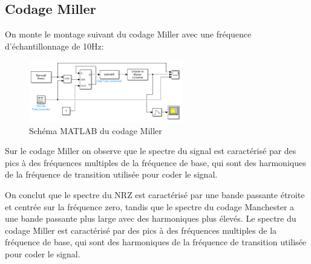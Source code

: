 \documentclass[11pt, openright]{book}
\begin{document}
\subsection{Codage Miller}

On monte le montage suivant du codage Miller avec une fréquence d'échantillonnage de 10Hz:

\begin{figure}[ht!]
	\centering
	\includegraphics[width=0.6\textwidth]{./object/g5.png}
	\caption{Schéma MATLAB du codage Miller}
\end{figure}

\begin{figure}[ht!]
	\begin{floatrow}


	\end{floatrow}
\end{figure}

Sur le codage Miller on observe que le spectre du signal est caractérisé par des pics à des fréquences multiples de la fréquence de base, qui sont des harmoniques de la fréquence de transition utilisée pour coder le signal.


On conclut que le spectre du NRZ est caractérisé par une bande passante étroite et centrée sur la fréquence zero, tandis que le spectre du codage Manchester a une bande passante plus large avec des harmoniques plus élevés. Le spectre du codage Miller est caractérisé par des pics à des fréquences multiples de la fréquence de base, qui sont des harmoniques de la fréquence de transition utilisée pour coder le signal.
\end{document}
